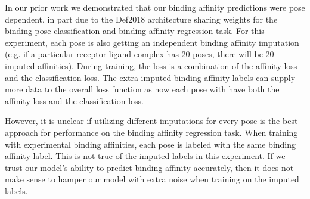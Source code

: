 \documentclass[journal=jcim,manuscript=article]{achemso}
\begin{document}
In our prior work we demonstrated that our binding affinity predictions were pose dependent, in part due to the Def2018 architecture sharing weights for the binding pose classification and binding affinity regression task\cite{crossdocked2020}.
For this experiment, each pose is also getting an independent binding affinity imputation (e.g. if a particular receptor-ligand complex has 20 poses, there will be 20 imputed affinities).
During training, the loss is a combination of the affinity loss and the classification loss.
The extra imputed binding affinity labels can supply more data to the overall loss function as now each pose with have both the affinity loss and the classification loss.

However, it is unclear if utilizing different imputations for every pose is the best approach for performance on the binding affinity regression task.
When training with experimental binding affinities, each pose is labeled with the same binding affinity label.
This is not true of the imputed labels in this experiment.
If we trust our model's ability to predict binding affinity accurately, then it does not make sense to hamper our model with extra noise when training on the imputed labels.
\end{document}

